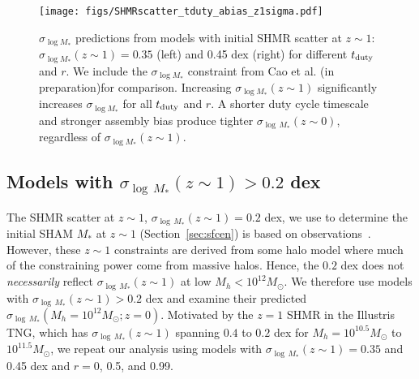 \documentclass[12pt, letterpaper, preprint, tighten]{aastex62}
\newcommand{\edt}[1]{{\color{dred}{\bf} #1}}
\newcommand{\cao}{Cao et al. (in preparation)}
\newcommand{\tduty}{t_{\rm duty}}
\newcommand{\siglogm}{\sigma_{\log M_*}}
\begin{document}
\begin{figure}
\begin{center}
    \texttt{[image: figs/SHMRscatter\_tduty\_abias\_z1sigma.pdf]}
    \caption{\edt{$\siglogm$ predictions from models with initial SHMR scatter at
    $z\sim1$: $\siglogm(z\sim1) = 0.35$ (left) and 0.45 dex (right) for different
    $\tduty$ and $r$. We include the $\siglogm$ constraint from \cao for comparison.
    Increasing $\siglogm(z\sim1)$ significantly increases $\siglogm$ for
    all $\tduty$ and $r$. A shorter duty cycle timescale and stronger assembly bias
    produce tighter $\sigma_{\log\,M_*}(z\sim0)$, regardless of $\siglogm(z\sim1)$.
    }}
\label{fig:sM_duty_abias_z1}
\end{center}
\end{figure}

\subsection{\edt{Models with  $\sigma_{\log\,M_*}(z\sim1) > 0.2$ dex}}
\edt{
The SHMR scatter at $z\sim1$, $\sigma_{\log\,M_*}(z\sim1) = 0.2$ dex, we
use to determine the initial SHAM $M_*$ at $z\sim1$ (Section~\ref{sec:sfcen})
is based on observations~\citep[\emph{e.g.}][]{leauthaud2012, tinker2013, patel2015}.
However, these $z\sim1$ constraints are derived from some halo model where
much of the constraining power come from massive halos. Hence, the $0.2$ dex
does not {\em necessarily} reflect $\sigma_{\log\,M_*}(z\sim1)$ at low
$M_h < 10^{12}M_\odot$. We therefore use models with
$\sigma_{\log\,M_*}(z\sim1) > 0.2$ dex and examine their predicted
$\sigma_{\log\,M_*}(M_h=10^{12}M_\odot; z=0)$.
Motivated by the $z=1$ SHMR in the Illustris TNG, which has
$\sigma_{\log\,M_*}(z\sim1)$ spanning $0.4$ to $0.2$ dex for $M_h = 10^{10.5}M_\odot$
to $10^{11.5}M_\odot$, we repeat our analysis using models with
$\sigma_{\log\,M_*}(z\sim1) = 0.35$ and 0.45 dex and $r=0$, 0.5,
and 0.99.
}
\end{document}
